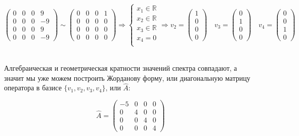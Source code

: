 \documentclass{article}
\begin{document}
$$\begin{pmatrix}
0 & 0 & 0 & 9 \\
0 & 0 & 0 & -9 \\
0 & 0 & 0 & 9 \\
0 & 0 & 0 & -9
\end{pmatrix} \sim \begin{pmatrix}
0 & 0 & 0 & 1 \\
0 & 0 & 0 & 0 \\
0 & 0 & 0 & 0 \\
0 & 0 & 0 & 0
\end{pmatrix} \Rightarrow \begin{cases}
x_1 \in \mathbb{R} \\
x_2 \in \mathbb{R} \\
x_3 \in \mathbb{R} \\
x_4 = 0 \\
\end{cases} \Rightarrow v_2 = \begin{pmatrix}
1 \\ 0 \\ 0 \\ 0
\end{pmatrix} \quad v_3 = \begin{pmatrix}
0 \\ 1 \\ 0 \\ 0
\end{pmatrix} \quad v_4 = \begin{pmatrix}
0 \\ 0 \\ 1 \\ 0
\end{pmatrix}$$ \\
\begin{center}
Алгебраическая и геометрическая кратности значений спектра совпадают, а значит мы уже можем построить Жорданову форму, или диагональную матрицу оператора в базисе $\{v_1, v_2, v_3, v_4\}$, или $\hat{A}$:
\end{center}
$$\hat{A} = \begin{pmatrix}
-5 & 0 & 0 & 0 \\
0 & 4 & 0 & 0 \\
0 & 0 & 4 & 0 \\
0 & 0 & 0 & 4
\end{pmatrix}$$
\end{document}
